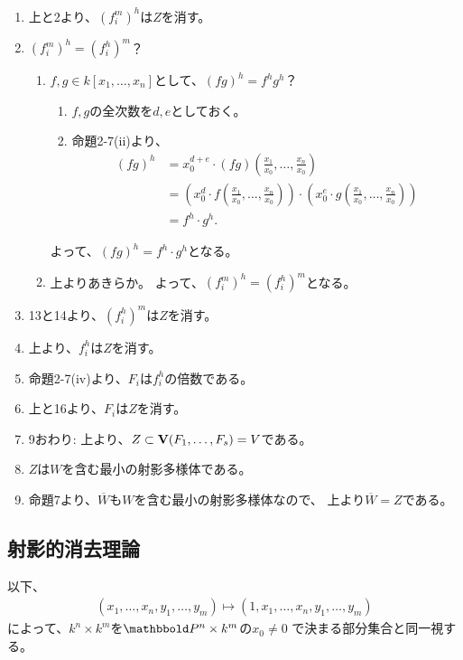 \begin{myproof}
\begin{enumerate}
    \item
    上と2より、$(f_i^m)^h$は$Z$を消す。
    \item
    $(f_i^m)^h = (f_i^h)^m$？
    \begin{enumerate}
      \item $f,g\in k[x_1,\dots,x_n]$として、$(fg)^h = f^h g^h$？
      \begin{enumerate}
        \item $f,g$の全次数を$d,e$としておく。
        \item  命題2-7(ii)より、
        \begin{align}
          (fg)^h
          &=
          x_0^{d+e} \cdot (fg)(\frac{x_1}{x_0},\dots,\frac{x_n}{x_0})\\
          &=
          (x_0^d \cdot f(\frac{x_1}{x_0},\dots,\frac{x_n}{x_0}))\cdot
          (x_0^e \cdot g(\frac{x_1}{x_0},\dots,\frac{x_n}{x_0}))\\
          &=
          f^h\cdot g^h.
        \end{align}
      \end{enumerate}
      よって、$(fg)^h = f^h \cdot g^h$となる。
      \item
      上よりあきらか。
      よって、$(f_i^m)^h = (f_i^h)^m$となる。
    \end{enumerate}
    \item
    13と14より、$(f_i^h)^m$は$Z$を消す。
    \item
    上より、$f_i^h$は$Z$を消す。
    \item
    命題2-7(iv)より、$F_i$は$f_i^h$の倍数である。
    \item
    上と16より、$F_i$は$Z$を消す。
    \item
    9おわり: 上より、$Z \subset \textbf V(F_1,\dots,F_s) = V$である。
    \item
    $Z$は$W$を含む最小の射影多様体である。
    \item
    命題7より、$\overline W$も$W$を含む最小の射影多様体なので、
    上より$\overline W = Z$である。
  \end{enumerate}
\end{myproof}

\subsection{射影的消去理論}
\label{sub:射影的消去理論}

以下、
\begin{align}
  (x_1,\dots,x_n,y_1,\dots,y_m)\mapsto
  (1,x_1,\dots,x_n,y_1,\dots,y_m)
\end{align}
によって、$k^n\times k^m$を$\P^n\times k^m$の$x_0\neq 0$
で決まる部分集合と同一視する。

